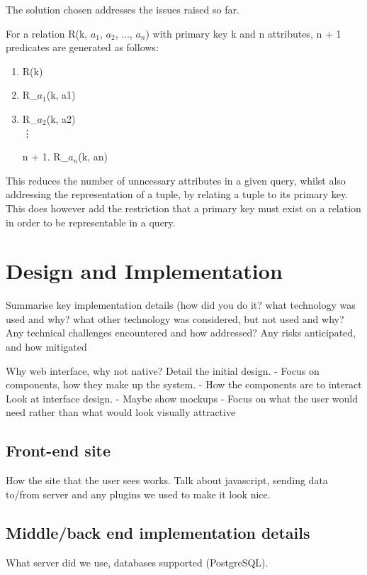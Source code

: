 \documentclass[a4paper, 11pt]{article}
\begin{document}
      The solution chosen addresses the issues raised so far.

      For a relation R(k, $a_{1}$, $a_{2}$, ..., $a_{n}$) with primary key k
      and n attributes, n + 1 predicates are generated as follows:
      \begin{enumerate}
        \item R(k)
        \item R\_$a_{1}$(k, a1)
        \item R\_$a_{2}$(k, a2)
        \\ \vdots
        \item[n + 1.] R\_$a_{n}$(k, an)
      \end{enumerate}

      This reduces the number of unncessary attributes in a given query, whilst
      also addressing the representation of a tuple, by relating a tuple to its
      primary key. This does however add the restriction that a primary key
      must exist on a relation in order to be representable in a query.

\section{Design and Implementation}
  Summarise key implementation details (how did you do it? what technology was
  used and why? what other technology was considered, but not used and why?
  Any technical challenges encountered and how addressed?  Any risks
  anticipated, and how mitigated

  Why web interface, why not native?
  Detail the initial design.
    - Focus on components, how they make up the system.
    - How the components are to interact
  Look at interface design.
    - Maybe show mockups
    - Focus on what the user would need rather than what would look
      visually attractive

  \subsection{Front-end site}
    How the site that the user sees works. Talk about javascript, sending data
    to/from server and any plugins we used to make it look nice.

  \subsection{Middle/back end implementation details}
    What server did we use, databases supported (PostgreSQL).
\end{document}
